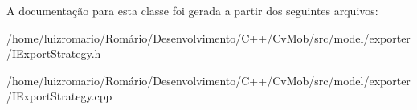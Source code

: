 A documentação para esta classe foi gerada a partir dos seguintes arquivos:\begin{DoxyCompactItemize}
\item 
/home/luizromario/Romário/Desenvolvimento/C++/CvMob/src/model/exporter/IExportStrategy.h\item 
/home/luizromario/Romário/Desenvolvimento/C++/CvMob/src/model/exporter/IExportStrategy.cpp\end{DoxyCompactItemize}
